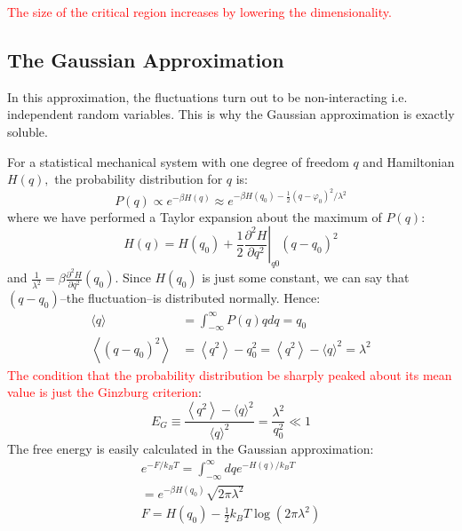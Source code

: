 \documentclass[12pt,titlepage]{article}
\newcommand{\redp}[1]{\textcolor{red}{#1}}
\numberwithin{equation}{section}
\begin{document}
\redp{The size of the critical region increases by lowering the dimensionality.}

\subsection{The Gaussian Approximation}
In this approximation, the fluctuations
turn out to be non-interacting i.e. independent random variables. This is why the Gaussian approximation is exactly soluble.

For a statistical mechanical system with one degree of freedom $q$ and Hamiltonian $H(q),$ the probability distribution for $q$ is:
\begin{equation}
P(q) \propto e^{-\beta H(q)} \approx e^{-\beta H\left(q_{0}\right)-\frac{1}{2}\left(q-\varphi_{0}\right)^{2} / \lambda^{2}}
\end{equation}
where we have performed a Taylor expansion about the maximum of $P(q)$:
\begin{equation}
H(q)=H\left(q_{0}\right)+\left.\frac{1}{2} \frac{\partial^{2} H}{\partial q^{2}}\right|_{q0}\left(q-q_{0}\right)^{2}
\end{equation}
and $\frac{1}{\lambda^{2}}=\beta \frac{\partial^{2} H}{\partial q^{2}}\left(q_{0}\right)$. Since $H(q_0)$ is just some constant, we can say that $(q-q_0)$--the fluctuation--is distributed normally. Hence:
\begin{equation}
\begin{aligned}\langle q\rangle &=\int_{-\infty}^{\infty} P(q) q d q=q_{0} \\\left\langle\left(q-q_{0}\right)^{2}\right\rangle &=\left\langle q^{2}\right\rangle- q_{0}^{2}=\left\langle q^{2}\right\rangle-\langle q\rangle^{2}=\lambda^{2} \end{aligned}
\end{equation}
\redp{The condition that the probability distribution be sharply peaked about its mean value is just the Ginzburg criterion}:
\begin{equation}
E_{G} \equiv \frac{\left\langle q^{2}\right\rangle-\langle q\rangle^{2}}{\langle q\rangle^{2}}=\frac{\lambda^{2}}{q_{0}^{2}} \ll 1
\end{equation}
The free energy is easily calculated in the Gaussian approximation:
\begin{equation}
\begin{array}{c}{e^{-F / k_{B} T}=\int_{-\infty}^{\infty} d q e^{-H(q) / k_{B} T}} \\ {=e^{-\beta H\left(q_{0}\right)} \sqrt{2 \pi \lambda^{2}}} \\ {F=H\left(q_{0}\right)-\frac{1}{2} k_{B} T \log \left(2 \pi \lambda^{2}\right)}\end{array}
\end{equation}
\end{document}
